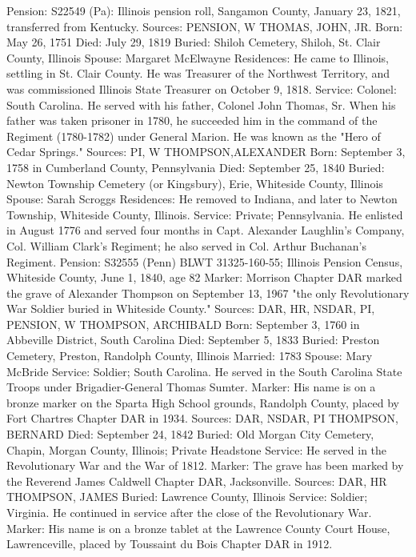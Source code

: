 Pension: S22549 (Pa): Illinois pension roll, Sangamon County, January 23, 1821, transferred from Kentucky. 
Sources: PENSION, W 
THOMAS, JOHN, JR. 
Born: May 26, 1751 
Died: July 29, 1819 
Buried: Shiloh Cemetery, Shiloh, St. Clair County, Illinois 
Spouse: Margaret McElwayne 
Residences: He came to Illinois, settling in St. Clair County. He was Treasurer of the Northwest Territory, and was commissioned Illinois State Treasurer on October 9, 1818. 
Service: Colonel: South Carolina. He served with his father, Colonel John Thom­as, Sr. When his father was taken prisoner in 1780, he succeeded him in the command of the Regiment (1780-1782) under General Marion. He was known as the "Hero of Cedar Springs." 
Sources: PI, W 
THOMPSON,ALEXANDER
Born: September 3, 1758 in Cumberland County, Pennsylvania
Died: September 25, 1840 
Buried: Newton Township Cemetery (or Kingsbury), Erie, Whiteside County, Illinois Spouse: Sarah Scroggs Residences: He removed to Indiana, and later to Newton Township, Whiteside County, Illinois. 
Service: Private; Pennsylvania. He enlisted in August 1776 and served four months in Capt. Alexander Laughlin's Company, Col. William Clark's Regiment; he also served in Col. Arthur Buchanan's Regiment. 
Pension: S32555 (Penn) BLWT 31325-160-55; Illinois Pension Census, Whiteside County, June 1, 1840, age 82 
Marker: Morrison Chapter DAR marked the grave of Alexander Thompson on September 13, 1967 "the only Revolutionary War Soldier buried in Whiteside County." 
Sources: DAR, HR, NSDAR, PI, PENSION, W 
THOMPSON, ARCHIBALD 
Born: September 3, 1760 in Abbeville District, South Carolina 
Died: September 5, 1833
Buried: Preston Cemetery, Preston, Randolph County, Illinois Married: 1783 Spouse: Mary McBride
Service: Soldier; South Carolina. He served in the South Carolina State Troops under Brigadier-General Thomas Sumter.
Marker: His name is on a bronze marker on the Sparta High School grounds, Randolph County, placed by Fort Chartres Chapter DAR in 1934. 
Sources: DAR, NSDAR, PI 
THOMPSON, BERNARD 
Died: September 24, 1842 
Buried: Old Morgan City Cemetery, Chapin, Morgan County, Illinois; Private Headstone 
Service: He served in the Revolutionary War and the War of 1812.
Marker: The grave has been marked by the Reverend James Caldwell Chapter DAR, Jacksonville. 
Sources: DAR, HR 
THOMPSON, JAMES 
Buried: Lawrence County, Illinois 
Service: Soldier; Virginia. He continued in service after the close of the Revolu­tionary War. 
Marker: His name is on a bronze tablet at the Lawrence County Court House, Lawrenceville, placed by Toussaint du Bois Chapter DAR in 1912. 
